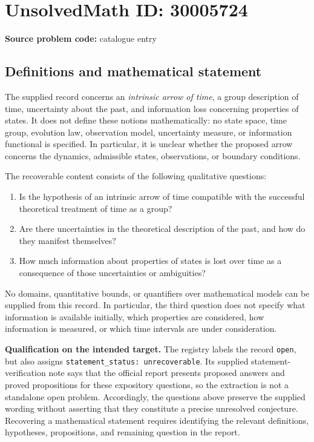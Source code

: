 \documentclass[11pt]{article}
\begin{document}
\section*{UnsolvedMath ID: 30005724}
\textbf{Source problem code:} catalogue entry
\subsection{Definitions and mathematical statement}
The supplied record concerns an \emph{intrinsic arrow of time}, a group description of time, uncertainty about the past, and information loss concerning properties of states. It does not define these notions mathematically: no state space, time group, evolution law, observation model, uncertainty measure, or information functional is specified. In particular, it is unclear whether the proposed arrow concerns the dynamics, admissible states, observations, or boundary conditions.

The recoverable content consists of the following qualitative questions:
\begin{enumerate}
\item Is the hypothesis of an intrinsic arrow of time compatible with the successful theoretical treatment of time as a group?
\item Are there uncertainties in the theoretical description of the past, and how do they manifest themselves?
\item How much information about properties of states is lost over time as a consequence of those uncertainties or ambiguities?
\end{enumerate}
No domains, quantitative bounds, or quantifiers over mathematical models can be supplied from this record. In particular, the third question does not specify what information is available initially, which properties are considered, how information is measured, or which time intervals are under consideration.

\textbf{Qualification on the intended target.} The registry labels the record \texttt{open}, but also assigns \texttt{statement\_status: unrecoverable}. Its supplied statement-verification note says that the official report presents proposed answers and proved propositions for these expository questions, so the extraction is not a standalone open problem. Accordingly, the questions above preserve the supplied wording without asserting that they constitute a precise unresolved conjecture. Recovering a mathematical statement requires identifying the relevant definitions, hypotheses, propositions, and remaining question in the report.
\end{document}

